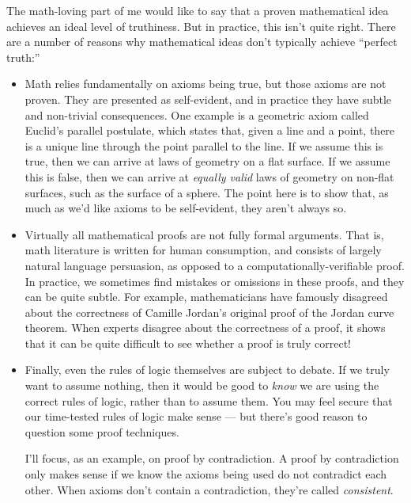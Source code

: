 \documentclass[11pt, oneside]{article}   	%
\begin{document}
The math-loving part of me would like to say that a proven mathematical idea
achieves an ideal level of truthiness. But in practice, this isn't quite
right. There are a number of reasons why mathematical ideas don't typically
achieve ``perfect truth:''
\begin{itemize}
    \item Math relies fundamentally on axioms being true, but those axioms are
        not proven. They are presented as self-evident, and in practice they
        have subtle and non-trivial consequences.
        One example is a geometric axiom called Euclid's parallel postulate,
        which states that, given a line and a point, there is a unique line
        through the point parallel to the line. If we assume this is true, then
        we can arrive at laws of geometry on a flat surface. If we assume this
        is false, then we can arrive at {\em equally valid} laws of geometry on
        non-flat surfaces, such as the surface of a sphere. The point here is to
        show that, as much as we'd like axioms to be self-evident, they aren't
        always so.
    \item Virtually all mathematical proofs are not fully formal
        arguments. That is, math literature is written for human consumption,
        and consists of largely natural language persuasion, as opposed to a
        computationally-verifiable proof. In practice, we sometimes find
        mistakes or omissions in these proofs, and they can be quite subtle. For
        example, mathematicians have famously disagreed about the correctness of
        Camille Jordan's original proof of the Jordan curve theorem.
        When experts disagree about the correctness of a proof, it shows that it
        can be quite difficult to see whether a proof is truly correct!
    \item Finally, even the rules of logic themselves are subject to debate. If
        we truly want to assume nothing, then it would be good to {\em know} we
        are using the correct rules of logic, rather than to assume them.
        You may feel secure that our time-tested rules of logic make sense ---
        but there's good reason to question some proof techniques.

        I'll focus, as an example, on proof by contradiction.
        A proof by contradiction
        only makes sense if we know the axioms being used do not contradict each
        other.
        When axioms don't contain a contradiction, they're called {\em
        consistent}.


\end{itemize}
\end{document}
